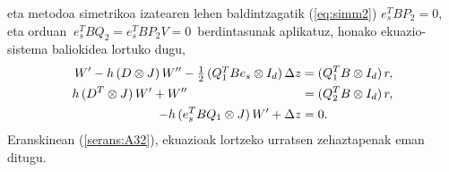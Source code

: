 eta metodoa simetrikoa izatearen lehen baldintzagatik (\ref{eq:simm2}) $e_s^TBP_2=0$, eta orduan $\ e_s^TBQ_2=e_s^TBP_2V=0$~berdintasunak aplikatuz, honako ekuazio-sistema baliokidea lortuko dugu,
\begin{equation}
\label{eq:linsys4}
  \begin{split}
       W' -h \, (D \otimes J)\,  W'' - \half\, (Q_1^T B e_s \otimes I_\dim) \, \Delta z &= (Q_1^T B \otimes I_\dim )\, r, \\
    h \, (D^T \otimes J)\, W'  + W'' \phantom{+\half\, (Q_2^T B e_s \otimes I_\dim) \, \Delta z  }
    &= (Q_2^T B \otimes I_\dim )\, r,\\
-h \, (e_s^T  B  Q_1 \otimes J) \, W' + \Delta z &= 0.
  \end{split}
\end{equation}
Eranskinean (\ref{serans:A32}), ekuazioak lortzeko urratsen zehaztapenak eman ditugu.

